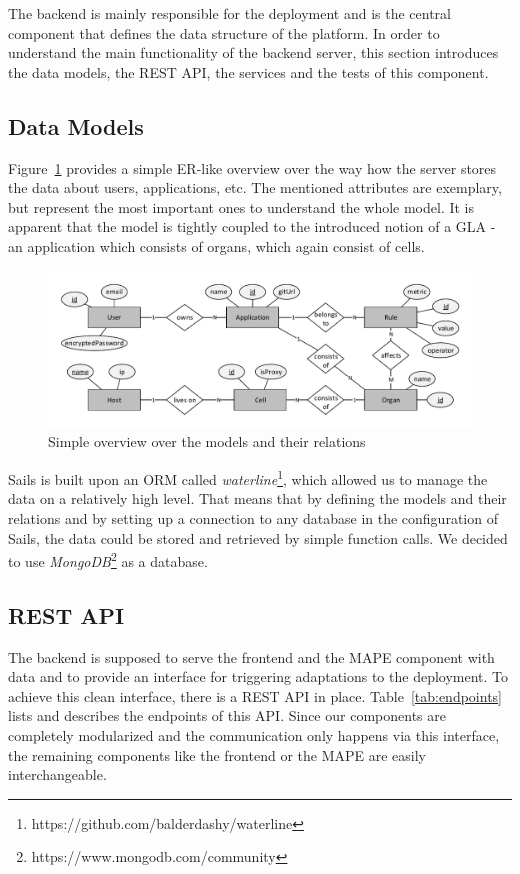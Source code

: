 \documentclass{seal_thesis}
\begin{document}
The backend is mainly responsible for the deployment and is the central component that defines the data structure of the platform. In order to understand the main functionality of the backend server, this section introduces the data models, the REST API, the services and the tests of this component.

\subsection{Data Models}
Figure~\ref{fig:models} provides a simple ER-like overview over the way how the server stores the data about users, applications, etc.
The mentioned attributes are exemplary, but represent the most important ones to understand the whole model.
It is apparent that the model is tightly coupled to the introduced notion of a GLA - an application which consists of organs, which again consist of cells.

\begin{figure}[!ht]
\centering
	\includegraphics[width=\textwidth]{models-overview.pdf}
	\caption{Simple overview over the models and their relations}
	\label{fig:models}
\end{figure}

Sails is built upon an ORM called \textit{waterline}\footnote{https://github.com/balderdashy/waterline}, which allowed us to manage the data on a relatively high level.
That means that by defining the models and their relations and by setting up a connection to any database in the configuration of Sails, the data could be stored and retrieved by simple function calls.
We decided to use \textit{MongoDB}\footnote{https://www.mongodb.com/community} as a database.

\subsection{REST API}
The backend is supposed to serve the frontend and the MAPE component with data and to provide an interface for triggering adaptations to the deployment.
To achieve this clean interface, there is a REST API in place. Table~\ref{tab:endpoints} lists and describes the endpoints of this API.
Since our components are completely modularized and the communication only happens via this interface, the remaining components like the frontend or the MAPE are easily interchangeable.
\end{document}
